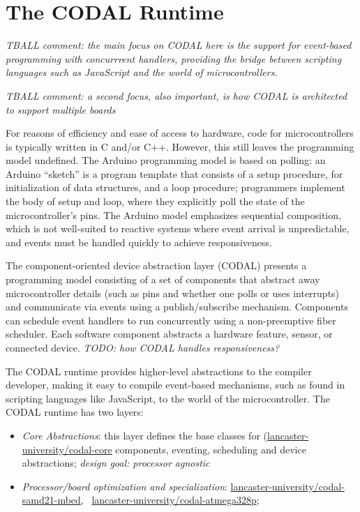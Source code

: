 \section{The CODAL Runtime}
\label{sec:codal}

\emph{TBALL comment: the main focus on CODAL here is the support for event-based programming with concurrrent handlers,
   providing the bridge between scripting languages such as JavaScript and the world of microcontrollers. }

\emph{TBALL comment: a second focus, also important, is how CODAL is architected to support multiple boards}

For reasons of efficiency and ease of access to hardware, code for microcontrollers is typically written in C and/or C++. 
However, this still leaves the programming model undefined. The Arduino programming model is based on polling: 
an Arduino ``sketch'' is a program template that consists of a setup procedure, for initialization of data structures,
and a loop procedure; programmers implement the body of setup and loop, where they explicitly poll the state of the
microcontroller’s pins. The Arduino model emphasizes sequential composition, which is not well-suited to reactive
systems where event arrival is unpredictable, and events must be handled quickly to achieve responsiveness.

The component-oriented device abstraction layer (CODAL) presents a programming model consisting of a set of
components that abstract away microcontroller details (such as pins and whether one polls or uses interrupts)
and communicate via events using a publish/subscribe mechanism.  Components can schedule event handlers to run
concurrently using a non-preemptive fiber scheduler. Each software component abstracts a hardware feature, sensor,
or connected device. \emph{TODO: how CODAL handles responsiveness?}

The CODAL runtime provides higher-level abstractions to the compiler developer, making it
easy to compile event-based mechanisms, such as found in scripting languages like JavaScript, to the world of the
microcontroller.   The CODAL runtime has two layers:
\begin{itemize}

\item \emph{Core Abstractions}: this layer defines the 
base classes for (\href{https://www.github.com/lancaster-university/codal-core}{lancaster-university/codal-core}
components, eventing, scheduling and device abstractions; \emph{design goal: processor agnostic}

\item \emph{Processor/board optimization and specialization}: 
\href{https://www.github.com/lancaster-university/codal-samd21-mbed}{lancaster-university/codal-samd21-mbed}, 
~\href{https://www.github.com/lancaster-university/codal-atmega328p}{lancaster-university/codal-atmega328p};
\end{itemize}

